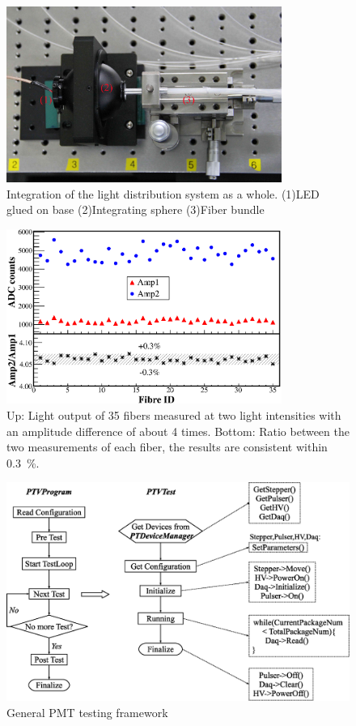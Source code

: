 \documentclass[preprint, times]{elsarticle}
\begin{document}
\begin{figure}
 \centering
 \includegraphics[width=90mm]{FIG4}
\caption{Integration of the light distribution system as a whole.
(1)LED glued on base (2)Integrating sphere (3)Fiber bundle}
\label{fig:FIG4}
\end{figure} 

\begin{figure}
 \centering
 \includegraphics[width=90mm]{FIG5}
\caption{Up: Light output of 35 fibers measured at two light intensities with an amplitude difference of about 4 times.
Bottom: Ratio between the two measurements of each fiber, the results are consistent within \textpm\SI{0.3}{\percent}.}
\label{fig:FIG5}
\end{figure} 

\begin{figure}
  \centering
 \includegraphics[width=125mm]{FIG6}
\caption{General PMT testing framework}
\label{fig:FIG6}
\end{figure}
\end{document}
